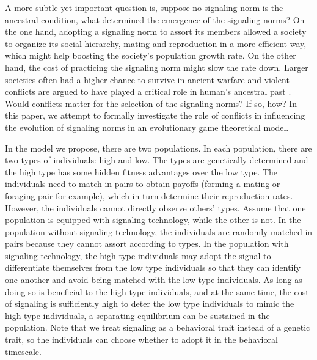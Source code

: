 A more subtle yet important question is, suppose no signaling norm is the ancestral condition, what determined the emergence of the signaling norms? On the one hand, adopting a signaling norm to assort its members allowed a society to organize its social hierarchy, mating and reproduction in a more efficient way, which might help boosting the society's population growth rate. On the other hand, the cost of practicing the signaling norm might slow the rate down. Larger societies often had a higher chance to survive in ancient warfare and violent conflicts are argued to have played a critical role in human's ancestral past \citep{Keeley1996, WranghamPeterson1996,  BussShackelford1997, LeBlancRegister2003, GuilaineXammit2004, Gat2006, PottsHayden2008, Ferguson2012}. Would conflicts matter for the selection of the signaling norms? If so, how? In this paper, we attempt to formally investigate the role of conflicts in influencing the evolution of signaling norms in an evolutionary game theoretical model. 

In the model we propose, there are two populations. In each population, there are two types of individuals: high and low. The types are genetically determined and the high type has some hidden fitness advantages over the low type. The individuals need to match in pairs to obtain payoffs (forming a mating or foraging pair for example), which in turn determine their reproduction rates. However, the individuals cannot directly observe others' types. Assume that one population is equipped with signaling technology, while the other is not. In the population without signaling technology, the individuals are randomly matched in pairs because they cannot assort according to types. In the population with signaling technology, the high type individuals may adopt the signal to differentiate themselves from the low type individuals so that they can identify one another and avoid being matched with the low type individuals. As long as doing so is beneficial to the high type individuals, and at the same time, the cost of signaling is sufficiently high to deter the low type individuals to mimic the high type individuals, a separating equilibrium can be sustained in the population. Note that we treat signaling as a behavioral trait instead of a genetic trait, so the individuals can choose whether to adopt it in the behavioral timescale. 

